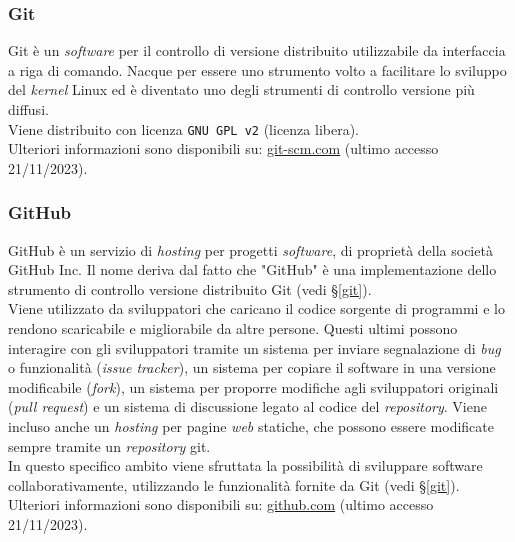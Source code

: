 
\subsubsection*{Git}
\label{git}
Git è un \textit{software} per il controllo di versione distribuito utilizzabile
da interfaccia a riga di comando.
Nacque per essere uno strumento volto a facilitare lo sviluppo del
\textit{kernel} Linux ed è diventato uno degli strumenti di controllo versione
più diffusi.\\
Viene distribuito con licenza \texttt{GNU GPL v2} (licenza libera). \\
Ulteriori informazioni sono disponibili su:
\href{https://git-scm.com/}{git-scm.com} (ultimo accesso 21/11/2023).

\subsubsection*{GitHub}
\label{github}
GitHub è un servizio di \textit{hosting} per progetti \textit{software}, di
proprietà della società GitHub Inc.
Il nome deriva dal fatto che "GitHub" è una implementazione dello strumento di
controllo versione distribuito Git (vedi \S\ref{git}). \\
Viene utilizzato da sviluppatori che caricano il codice sorgente di programmi e
lo rendono scaricabile e migliorabile da altre persone.
Questi ultimi possono interagire con gli sviluppatori tramite un sistema per
inviare segnalazione di \textit{bug} o funzionalità (\textit{issue tracker}), un sistema
per copiare il software in una versione modificabile (\textit{fork}), un sistema
per proporre modifiche agli sviluppatori originali (\textit{pull request}) e un
sistema di discussione legato al codice del \textit{repository}.
Viene incluso anche un \textit{hosting} per pagine \textit{web} statiche, che
possono essere modificate sempre tramite un \textit{repository} git.\\
In questo specifico ambito viene sfruttata la possibilità di sviluppare software
collaborativamente, utilizzando le funzionalità fornite da
Git (vedi \S\ref{git}). \\
Ulteriori informazioni sono disponibili su:
\href{https://github.com/}{github.com} (ultimo accesso 21/11/2023).

\newpage
